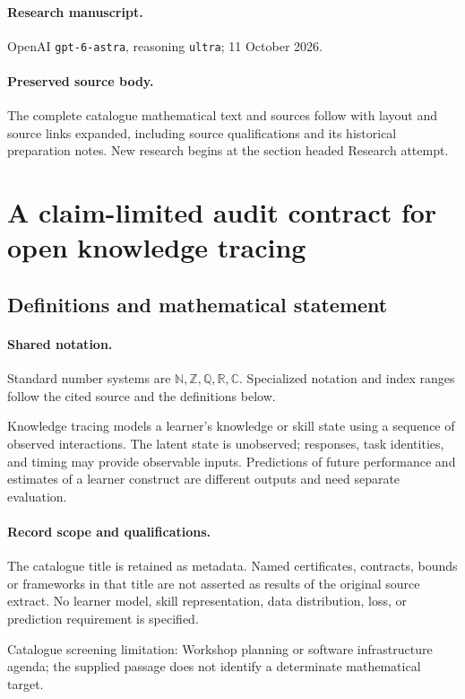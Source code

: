 \documentclass[11pt]{article}
\begin{document}
\paragraph{Research manuscript.} OpenAI \texttt{gpt-6-astra}, reasoning \texttt{ultra}; 11 October 2026.
\paragraph{Preserved source body.} The complete catalogue mathematical text and sources follow with layout and source links expanded, including source qualifications and its historical preparation notes. New research begins at the section headed Research attempt.

\section{A claim-limited audit contract for open knowledge tracing}\label{statement}

\subsection{Definitions and mathematical statement}

\paragraph{Shared notation.}Standard number systems are $\mathbb N,\mathbb Z,\mathbb Q,\mathbb R,\mathbb C$. Specialized notation and index ranges follow the cited source and the definitions below.


Knowledge tracing models a learner's knowledge or skill state using a sequence of observed interactions. The latent state is unobserved; responses, task identities, and timing may provide observable inputs. Predictions of future performance and estimates of a learner construct are different outputs and need separate evaluation.
\paragraph{Record scope and qualifications.}
The catalogue title is retained as metadata. Named certificates, contracts, bounds or frameworks in that title are not asserted as results of the original source extract.
No learner model, skill representation, data distribution, loss, or prediction requirement is specified.

Catalogue screening limitation: Workshop planning or software infrastructure agenda; the supplied passage does not identify a determinate mathematical target.
\end{document}
